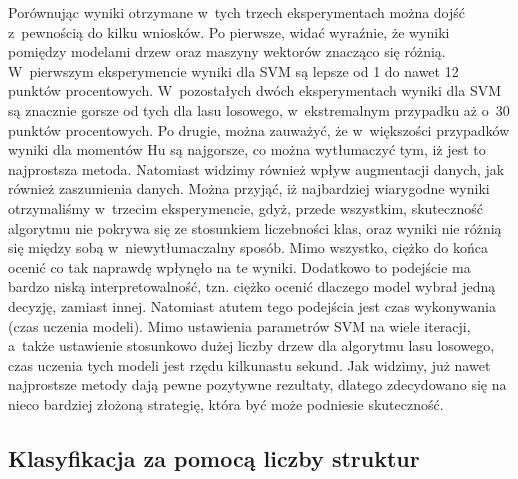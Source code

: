 Porównując wyniki otrzymane w~tych trzech eksperymentach można dojść z~pewnością do kilku wniosków. Po pierwsze, widać wyraźnie, że wyniki pomiędzy modelami drzew oraz maszyny wektorów znacząco się różnią. W~pierwszym eksperymencie wyniki dla SVM są lepsze od 1 do nawet 12 punktów procentowych. W~pozostałych dwóch eksperymentach wyniki dla SVM są znacznie gorsze od tych dla lasu losowego, w~ekstremalnym przypadku aż o~30 punktów procentowych. Po drugie, można zauważyć, że w~większości przypadków wyniki dla momentów Hu są najgorsze, co można wytłumaczyć tym, iż jest to najprostsza metoda. Natomiast widzimy również wpływ augmentacji danych, jak również zaszumienia danych. Można przyjąć, iż najbardziej wiarygodne wyniki otrzymaliśmy w~trzecim eksperymencie, gdyż, przede wszystkim, skuteczność algorytmu nie pokrywa się ze stosunkiem liczebności klas, oraz wyniki nie różnią się między sobą w~niewytłumaczalny sposób. Mimo wszystko, ciężko do końca ocenić co tak naprawdę wpłynęło na te wyniki. Dodatkowo to podejście ma bardzo niską interpretowalność, tzn. ciężko ocenić dlaczego model wybrał jedną decyzję, zamiast innej. Natomiast atutem tego podejścia jest czas wykonywania (czas uczenia modeli). Mimo ustawienia parametrów SVM na wiele iteracji, a~także ustawienie stosunkowo dużej liczby drzew dla algorytmu lasu losowego, czas uczenia tych modeli jest rzędu kilkunastu sekund. Jak widzimy, już nawet najprostsze metody dają pewne pozytywne rezultaty, dlatego zdecydowano się na nieco bardziej złożoną strategię, która być może podniesie skuteczność.

\subsection{Klasyfikacja za pomocą liczby struktur}
\label{Klasyfikacja za pomocą liczby struktur} %

